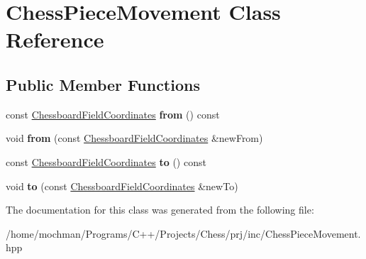 \hypertarget{class_chess_piece_movement}{\section{Chess\-Piece\-Movement Class Reference}
\label{class_chess_piece_movement}
}
\subsection*{Public Member Functions}
\begin{DoxyCompactItemize}
\item 
\hypertarget{class_chess_piece_movement_a5908ece8f9a24104026144150f566553}{const \hyperlink{class_chessboard_field_coordinates}{Chessboard\-Field\-Coordinates} {\bfseries from} () const }\label{class_chess_piece_movement_a5908ece8f9a24104026144150f566553}

\item 
\hypertarget{class_chess_piece_movement_aea360a5318198156f9b7e190a1e3f52c}{void {\bfseries from} (const \hyperlink{class_chessboard_field_coordinates}{Chessboard\-Field\-Coordinates} \&new\-From)}\label{class_chess_piece_movement_aea360a5318198156f9b7e190a1e3f52c}

\item 
\hypertarget{class_chess_piece_movement_acbb3df8a9ec99807a489262fb97a02f9}{const \hyperlink{class_chessboard_field_coordinates}{Chessboard\-Field\-Coordinates} {\bfseries to} () const }\label{class_chess_piece_movement_acbb3df8a9ec99807a489262fb97a02f9}

\item 
\hypertarget{class_chess_piece_movement_a701ab548322803c5033ff4a1244b5652}{void {\bfseries to} (const \hyperlink{class_chessboard_field_coordinates}{Chessboard\-Field\-Coordinates} \&new\-To)}\label{class_chess_piece_movement_a701ab548322803c5033ff4a1244b5652}

\end{DoxyCompactItemize}


The documentation for this class was generated from the following file\-:\begin{DoxyCompactItemize}
\item 
/home/mochman/\-Programs/\-C++/\-Projects/\-Chess/prj/inc/Chess\-Piece\-Movement.\-hpp\end{DoxyCompactItemize}
